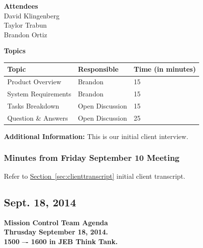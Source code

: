 \documentclass[pdftex,11pt]{article}
\begin{document}
{ \large \bfseries \hspace*{2 mm} Attendees\\}
\hspace*{12mm} David Klingenberg\\
\hspace*{12mm} Taylor Trabun\\
\hspace*{12mm} Brandon Ortiz\\
\vspace*{1.5mm}

{ \large \bfseries \noindent Topics}
\vspace*{2.5mm}

\begin{tabular}{| l | l | l |}
  \hline
  \bfseries Topic & \bfseries Responsible & \bfseries Time (in minutes) \\ \hline
  Product  Overview  &  Brandon &  15 \\ \hline
  System  Requirements & Brandon & 15 \\ \hline
  Tasks Breakdown & Open Discussion & 15 \\ \hline
  Question \&  Answers  & Open Discussion & 25 \\ 
  \hline
\end{tabular}

\vspace*{2.5mm}
{ \large \bfseries \noindent Additional Information:}
This is our initial client interview.

\subsubsection[short]{Minutes from Friday September 10 Meeting}
Refer to \hyperref[sec:clienttranscript]{Section~\ref{sec:clienttranscript}} initial client  transcript.


\subsection{Sept. 18, 2014}
{ \huge \bfseries Mission Control Team Agenda \\[0.4cm] }
{ \huge \bfseries Thrusday September  18, 2014.\\1500 –-  1600  in JEB   Think  Tank. \\[0.4cm] }
\vspace*{2.5mm}
\end{document}
